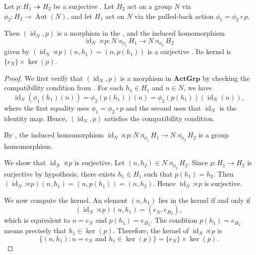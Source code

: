 \begin{corollary} \label{corollary:surjection_of_acting_group_induces_surjection_of_semidirect_products}
    Let $p: H_1 \twoheadrightarrow H_2$ be a surjective . Let $H_2$ act on a group $N$ via $\phi_2: H_2 \to \operatorname{Aut}(N)$, and let $H_1$ act on $N$ via the pulled-back action $\phi_1 = \phi_2 \circ p$.

    Then $(\operatorname{id}_N, p)$ is a morphism in the , and the induced homomorphism
    $$\operatorname{id}_N \rtimes p : N \rtimes_{\phi_1} H_1 \longrightarrow N \rtimes_{\phi_2} H_2$$
    given by $(\operatorname{id}_N \rtimes p)(n, h_1) = (n, p(h_1))$ is a surjective . Its kernel is $\{e_N\} \times \ker(p)$.
\end{corollary}
\begin{proof}
    We first verify that $(\operatorname{id}_N, p)$ is a morphism in $\mathbf{ActGrp}$ by checking the compatibility condition from . For each $h_1 \in H_1$ and $n \in N$, we have
    $$\operatorname{id}_N(\phi_1(h_1)(n)) = \phi_2(p(h_1))(n) = \phi_2(p(h_1))(\operatorname{id}_N(n)),$$
    where the first equality uses $\phi_1 = \phi_2 \circ p$ and the second uses that $\operatorname{id}_N$ is the identity map. Hence, $(\operatorname{id}_N, p)$ satisfies the compatibility condition.

    By , the induced homomorphism $\operatorname{id}_N \rtimes p : N \rtimes_{\phi_1} H_1 \to N \rtimes_{\phi_2} H_2$ is a group homomorphism.

    We show that $\operatorname{id}_N \rtimes p$ is surjective. Let $(n, h_2) \in N \rtimes_{\phi_2} H_2$. Since $p: H_1 \to H_2$ is surjective by hypothesis, there exists $h_1 \in H_1$ such that $p(h_1) = h_2$. Then $(\operatorname{id}_N \rtimes p)(n, h_1) = (n, p(h_1)) = (n, h_2)$. Hence $\operatorname{id}_N \rtimes p$ is surjective.

    We now compute the kernel. An element $(n, h_1)$ lies in the kernel if and only if
    $$(\operatorname{id}_N \rtimes p)(n, h_1) = (e_N, e_{H_2}),$$
    which is equivalent to $n = e_N$ and $p(h_1) = e_{H_2}$. The condition $p(h_1) = e_{H_2}$ means precisely that $h_1 \in \ker(p)$. Therefore, the kernel of $\operatorname{id}_N \rtimes p$ is
    $$\{(n, h_1) : n = e_N \text{ and } h_1 \in \ker(p)\} = \{e_N\} \times \ker(p).$$
\end{proof}
